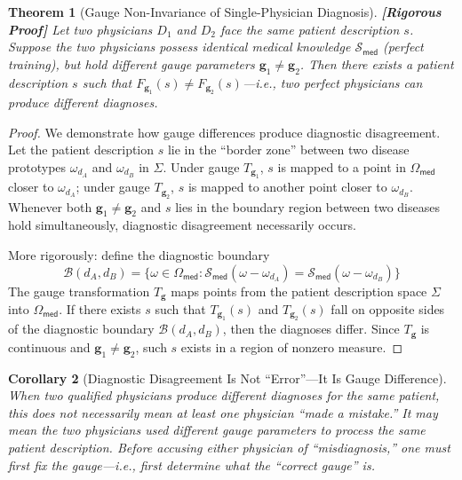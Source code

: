 \documentclass[12pt,a4paper]{article}
\newtheorem{theorem}{Theorem}[section]
\newtheorem{corollary}[theorem]{Corollary}
\theoremstyle{remark}
\newcommand{\med}{\textsf{med}}
\newcommand{\rigorFull}{\textnormal{\textbf{[Rigorous Proof]}}}
\begin{document}
\begin{theorem}[Gauge Non-Invariance of Single-Physician Diagnosis]\label{thm:noninvariant}\rigorFull
Let two physicians $D_1$ and $D_2$ face the same patient description $s$. Suppose the two physicians possess identical medical knowledge $\mathcal{S}_{\med}$ (perfect training), but hold different gauge parameters $\mathbf{g}_1 \neq \mathbf{g}_2$. Then there exists a patient description $s$ such that $F_{\mathbf{g}_1}(s) \neq F_{\mathbf{g}_2}(s)$---i.e., two perfect physicians can produce different diagnoses.
\end{theorem}

\begin{proof}
We demonstrate how gauge differences produce diagnostic disagreement. Let the patient description $s$ lie in the ``border zone'' between two disease prototypes $\omega_{d_A}$ and $\omega_{d_B}$ in $\Sigma$. Under gauge $T_{\mathbf{g}_1}$, $s$ is mapped to a point in $\Omega_{\med}$ closer to $\omega_{d_A}$; under gauge $T_{\mathbf{g}_2}$, $s$ is mapped to another point closer to $\omega_{d_B}$. Whenever both $\mathbf{g}_1 \neq \mathbf{g}_2$ and $s$ lies in the boundary region between two diseases hold simultaneously, diagnostic disagreement necessarily occurs.

More rigorously: define the diagnostic boundary
\begin{equation}
    \mathcal{B}(d_A, d_B) = \{\omega \in \Omega_{\med} : \mathcal{S}_{\med}(\omega - \omega_{d_A}) = \mathcal{S}_{\med}(\omega - \omega_{d_B})\}
\end{equation}
The gauge transformation $T_{\mathbf{g}}$ maps points from the patient description space $\Sigma$ into $\Omega_{\med}$. If there exists $s$ such that $T_{\mathbf{g}_1}(s)$ and $T_{\mathbf{g}_2}(s)$ fall on opposite sides of the diagnostic boundary $\mathcal{B}(d_A, d_B)$, then the diagnoses differ. Since $T_{\mathbf{g}}$ is continuous and $\mathbf{g}_1 \neq \mathbf{g}_2$, such $s$ exists in a region of nonzero measure.
\end{proof}

\begin{corollary}[Diagnostic Disagreement Is Not ``Error''---It Is Gauge Difference]\label{cor:disagreement}
When two qualified physicians produce different diagnoses for the same patient, this does not necessarily mean at least one physician ``made a mistake.'' It may mean the two physicians used different gauge parameters to process the same patient description. Before accusing either physician of ``misdiagnosis,'' one must first fix the gauge---i.e., first determine what the ``correct gauge'' is.
\end{corollary}
\end{document}
